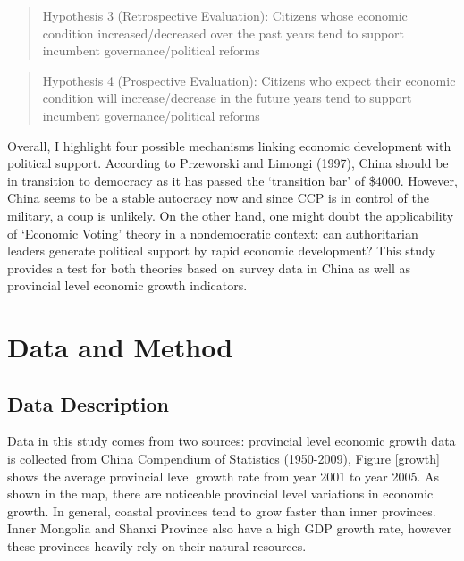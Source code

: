 \documentclass[12pt]{article}\usepackage[]{graphicx}\usepackage[]{color}
\begin{document}
\begin{quotation}
	Hypothesis 3 (Retrospective Evaluation): Citizens whose economic condition increased/decreased over the past years tend to support incumbent governance/political reforms
\end{quotation}

\begin{quotation}
	Hypothesis 4 (Prospective Evaluation): Citizens who expect their economic condition will increase/decrease in the future years tend to support incumbent governance/political reforms
\end{quotation}

Overall, I highlight four possible mechanisms linking economic development with political support.
 According to Przeworski and Limongi (1997), China should be in transition to democracy as it has passed the `transition bar' of \$4000. However, China seems to be a stable autocracy now and since CCP is in control of the military, a coup is unlikely. On the other hand, one might doubt the applicability of `Economic Voting' theory in a nondemocratic context: can authoritarian leaders generate political support by rapid economic development? This study provides a test for both theories based on survey data in China as well as provincial level economic growth indicators.
  







\nocite{Tsai2007a}
  






\section{Data and Method}
\subsection{Data Description}
Data in this study comes from two sources: provincial level economic growth data is collected from China Compendium of Statistics (1950-2009), Figure \ref{growth} shows the average provincial level growth rate from year 2001 to year 2005. As shown in the map, there are noticeable provincial level variations in economic growth. In general, coastal provinces tend to grow faster than inner provinces. Inner Mongolia and Shanxi Province also have a high GDP growth rate, however these provinces heavily rely on their natural resources.
\end{document}
